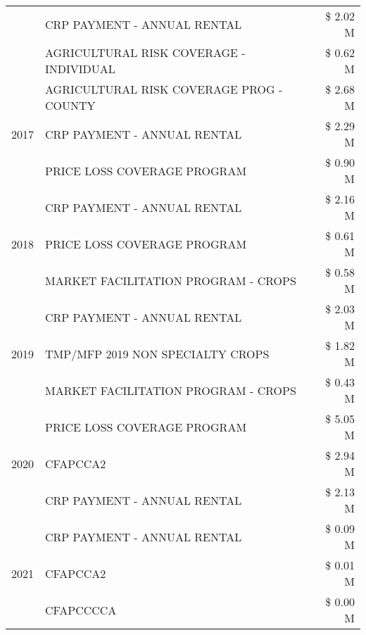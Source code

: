 \begin{tabular}{llr}
 & CRP PAYMENT - ANNUAL RENTAL & \$ 2.02 M \\
 & AGRICULTURAL RISK COVERAGE - INDIVIDUAL & \$ 0.62 M \\
\cline{1-3}
\multirow[t]{3}{*}{2017} & AGRICULTURAL RISK COVERAGE PROG - COUNTY & \$ 2.68 M \\
 & CRP PAYMENT - ANNUAL RENTAL & \$ 2.29 M \\
 & PRICE LOSS COVERAGE PROGRAM & \$ 0.90 M \\
\cline{1-3}
\multirow[t]{3}{*}{2018} & CRP PAYMENT - ANNUAL RENTAL & \$ 2.16 M \\
 & PRICE LOSS COVERAGE PROGRAM & \$ 0.61 M \\
 & MARKET FACILITATION PROGRAM - CROPS & \$ 0.58 M \\
\cline{1-3}
\multirow[t]{3}{*}{2019} & CRP PAYMENT - ANNUAL RENTAL & \$ 2.03 M \\
 & TMP/MFP 2019 NON SPECIALTY CROPS & \$ 1.82 M \\
 & MARKET FACILITATION PROGRAM - CROPS & \$ 0.43 M \\
\cline{1-3}
\multirow[t]{3}{*}{2020} & PRICE LOSS COVERAGE PROGRAM & \$ 5.05 M \\
 & CFAPCCA2 & \$ 2.94 M \\
 & CRP PAYMENT - ANNUAL RENTAL & \$ 2.13 M \\
\cline{1-3}
\multirow[t]{3}{*}{2021} & CRP PAYMENT - ANNUAL RENTAL & \$ 0.09 M \\
 & CFAPCCA2 & \$ 0.01 M \\
 & CFAPCCCCA & \$ 0.00 M \\
\cline{1-3}
\bottomrule
\end{tabular}
